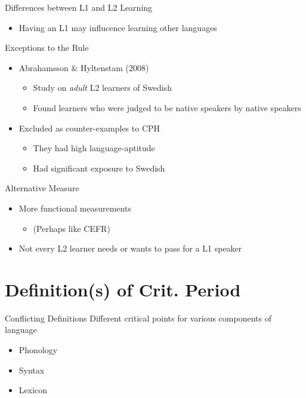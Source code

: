 \documentclass{beamer}
\begin{document}
\begin{frame}{Differences between L1 and L2 Learning}
  \begin{itemize}
    \item Having an L1 may influcence learning other languages
  \end{itemize}
\end{frame}

\begin{frame}{Exceptions to the Rule}
  \begin{itemize}
    \item Abrahamsson \& Hyltenstam (2008)
    \begin{itemize}
      \item Study on \emph{adult} L2 learners of Swedish
      \item Found learners who were judged to be native speakers by native speakers
    \end{itemize}
    \item Excluded as counter-examples to CPH
    \begin{itemize}
      \item They had high language-aptitude
      \item Had significant exposure to Swedish
    \end{itemize}
  \end{itemize}
\end{frame}

\begin{frame}{Alternative Measure}
  \begin{itemize}
    \item More functional measurements
    \begin{itemize}
      \item (Perhaps like CEFR\footnotemark {})
    \end{itemize}
    \item Not every L2 learner needs or wants to pass for a L1 speaker
  \end{itemize}
\end{frame}

\section{Definition(s) of Crit. Period}

\begin{frame}{Conflicting Definitions}
  Different critical points for various components of language
  \begin{itemize}
    \item Phonology

    \item Syntax

    \item Lexicon
  \end{itemize}
\end{frame}
\end{document}
